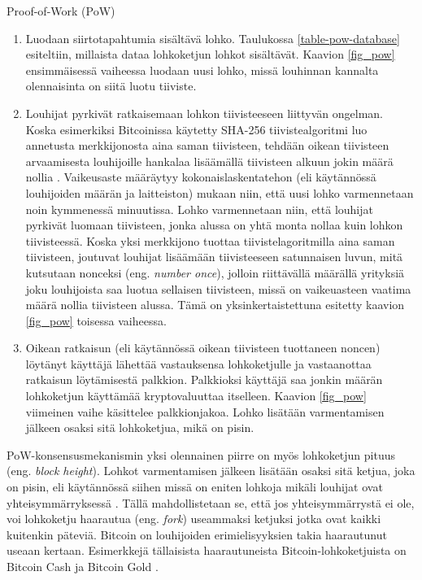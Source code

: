 \begin{section}{Proof-of-Work (PoW)\label{pow}}
\begin{enumerate}
\item Luodaan siirtotapahtumia sisältävä lohko. Taulukossa \ref{table-pow-database} esiteltiin, millaista dataa lohkoketjun lohkot sisältävät. Kaavion \ref{fig_pow} ensimmäisessä vaiheessa luodaan uusi lohko, missä louhinnan kannalta olennaisinta on siitä luotu tiiviste.
\item Louhijat pyrkivät ratkaisemaan lohkon tiivisteeseen liittyvän ongelman. Koska esimerkiksi Bitcoinissa käytetty SHA-256 tiivistealgoritmi luo annetusta merkkijonosta aina saman tiivisteen, tehdään oikean tiivisteen arvaamisesta louhijoille hankalaa lisäämällä tiivisteen alkuun jokin määrä nollia \cite{satoshibitcoin}. Vaikeusaste määräytyy kokonaislaskentatehon (eli käytännössä louhijoiden määrän ja laitteiston) mukaan niin, että uusi lohko varmennetaan noin kymmenessä minuutissa. Lohko varmennetaan niin, että louhijat pyrkivät luomaan tiivisteen, jonka alussa on yhtä monta nollaa kuin lohkon tiivisteessä. Koska yksi merkkijono tuottaa tiivistelagoritmilla aina saman tiivisteen, joutuvat louhijat lisäämään tiivisteeseen satunnaisen luvun, mitä kutsutaan nonceksi (eng. \textit{number once}), jolloin riittävällä määrällä yrityksiä joku louhijoista saa luotua sellaisen tiivisteen, missä on vaikeuasteen vaatima määrä nollia tiivisteen alussa. Tämä on yksinkertaistettuna esitetty kaavion \ref{fig_pow} toisessa vaiheessa.
\item Oikean ratkaisun (eli käytännössä oikean tiivisteen tuottaneen noncen) löytänyt käyttäjä lähettää vastauksensa lohkoketjulle ja vastaanottaa ratkaisun löytämisestä palkkion. Palkkioksi käyttäjä saa jonkin määrän lohkoketjun käyttämää kryptovaluuttaa itselleen. Kaavion \ref{fig_pow} viimeinen vaihe käsittelee palkkionjakoa. Lohko lisätään varmentamisen jälkeen osaksi sitä lohkoketjua, mikä on pisin.
\end{enumerate}

PoW-konsensusmekanismin yksi olennainen piirre on myös lohkoketjun pituus (eng. \textit{block height}). Lohkot varmentamisen jälkeen lisätään osaksi sitä ketjua, joka on pisin, eli käytännössä siihen missä on eniten lohkoja mikäli louhijat ovat yhteisymmärryksessä \cite{satoshibitcoin}. Tällä mahdollistetaan se, että jos yhteisymmärrystä ei ole, voi lohkoketju haarautua (eng. \textit{fork}) useammaksi ketjuksi jotka ovat kaikki kuitenkin päteviä. Bitcoin on louhijoiden erimielisyyksien takia haarautunut useaan kertaan. Esimerkkejä tällaisista haarautuneista Bitcoin-lohkoketjuista on Bitcoin Cash \cite{bitcoin-cash} ja Bitcoin Gold \cite{bitcoin-gold}.


\end{section}
